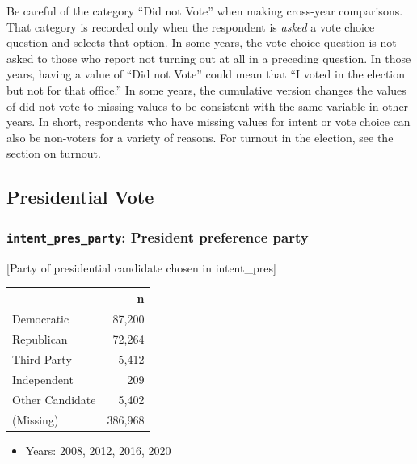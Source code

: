\documentclass[10pt,article,oneside]{memoir}
\theoremstyle{definition}
\begin{document}
Be careful of the category ``Did not Vote'' when making cross-year
comparisons. That category is recorded only when the respondent is
\emph{asked} a vote choice question and selects that option. In some
years, the vote choice question is not asked to those who report not
turning out at all in a preceding question. In those years, having a
value of ``Did not Vote'' could mean that ``I voted in the election but
not for that office.'' In some years, the cumulative version changes the
values of did not vote to missing values to be consistent with the same
variable in other years. In short, respondents who have missing values
for intent or vote choice can also be non-voters for a variety of
reasons. For turnout in the election, see the section on turnout.

\hypertarget{presidential-vote}{%
\subsection{Presidential Vote}\label{presidential-vote}}

\hypertarget{intent_pres_party-president-preference-party}{%
\subsubsection{\texorpdfstring{\texttt{intent\_pres\_party}: President
preference
party}{intent\_pres\_party: President preference party}}\label{intent_pres_party-president-preference-party}}

{[}Party of presidential candidate chosen in intent\_pres{]}

\begin{table}[H]
\centering
\begin{tabular}[t]{lr}
\toprule
 & n\\
\midrule
Democratic & 87,200\\
Republican & 72,264\\
Third Party & 5,412\\
Independent & 209\\
Other Candidate & 5,402\\
(Missing) & 386,968\\
\bottomrule
\end{tabular}
\end{table}

\begin{itemize}
\tightlist
\item
  Years: 2008, 2012, 2016, 2020
\end{itemize}
\end{document}
